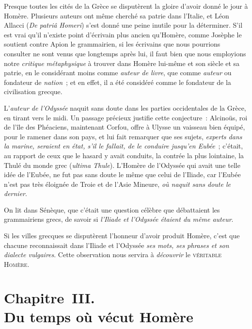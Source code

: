 \documentclass[french,twoside]{book} %
\newcommand\chapteropen{} %
\newcommand\chaptercont{} %
\newcommand\chapterclose{} %
\begin{document}
\chaptercont
\noindent  Presque toutes les cités de la Grèce se disputèrent la gloire d’avoir donné le jour à Homère. Plusieurs auteurs ont même cherché sa patrie dans l’Italie, et Léon Allacci ({\itshape De patriâ Homeri}) s’est donné une peine inutile pour la déterminer. S’il est vrai qu’il n’existe point d’écrivain plus ancien qu’Homère, comme Josèphe le soutient contre Apion le grammairien, si les écrivains que nous pourrions consulter ne sont venus que longtemps après lui, il faut bien que nous employions notre {\itshape critique métaphysique} à trouver dans Homère lui-même et son siècle et sa patrie, en le considérant moins comme {\itshape auteur de livre}, que comme {\itshape auteur} ou fondateur de {\itshape nation} ; et en effet, il a été considéré comme le fondateur de la civilisation grecque.\par
L’{\itshape auteur de l’Odyssée} naquit sans doute dans les parties occidentales de la Grèce, en tirant vers le midi. Un passage précieux justifie cette conjecture : Alcinoüs, roi de l’île des Phéaciens, maintenant Corfou,  offre à Ulysse un vaisseau bien équipé, pour le ramener dans son pays, et lui fait remarquer que ses sujets, \emph{{\itshape experts dans la marine, seraient en état, s’il le fallait, de le conduire jusqu’en Eubée}} ; c’était, au rapport de ceux que le hasard y avait conduits, la contrée la plus lointaine, la Thulé du monde grec ({\itshape ultima Thule}). L’Homère de l’Odyssée qui avait une telle idée de l’Eubée, ne fut pas sans doute le même que celui de l’Iliade, car l’Eubée n’est pas très éloignée de Troie et de l’Asie Mineure, {\itshape où naquit sans doute le dernier}.\par
On lit dans Sénèque, que c’était une question célèbre que débattaient les grammairiens grecs, de savoir si {\itshape l’Iliade et l’Odyssée étaient du même auteur}.\par
Si les villes grecques se disputèrent l’honneur d’avoir produit Homère, c’est que chacune reconnaissait dans l’Iliade et l’Odyssée {\itshape ses mots, ses phrases et son dialecte vulgaires}. Cette observation nous servira à {\itshape découvrir} le {\scshape véritable Homère}.
\chapterclose


\chapteropen
\chapter[{Chapitre III. Du temps où vécut Homère}]{Chapitre III. \\
Du temps où vécut Homère}
\end{document}
